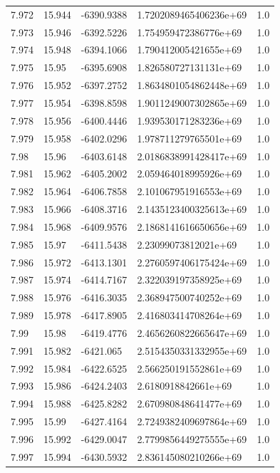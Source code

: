 \begin{tabular}{lllll}
7.972 & 15.944 & -6390.9388 & 1.7202089465406236e+69 & 1.0 \\
7.973 & 15.946 & -6392.5226 & 1.754959472386776e+69 & 1.0 \\
7.974 & 15.948 & -6394.1066 & 1.790412005421655e+69 & 1.0 \\
7.975 & 15.95 & -6395.6908 & 1.826580727131131e+69 & 1.0 \\
7.976 & 15.952 & -6397.2752 & 1.8634801054862448e+69 & 1.0 \\
7.977 & 15.954 & -6398.8598 & 1.9011249007302865e+69 & 1.0 \\
7.978 & 15.956 & -6400.4446 & 1.939530171283236e+69 & 1.0 \\
7.979 & 15.958 & -6402.0296 & 1.978711279765501e+69 & 1.0 \\
7.98 & 15.96 & -6403.6148 & 2.0186838991428417e+69 & 1.0 \\
7.981 & 15.962 & -6405.2002 & 2.059464018995926e+69 & 1.0 \\
7.982 & 15.964 & -6406.7858 & 2.101067951916553e+69 & 1.0 \\
7.983 & 15.966 & -6408.3716 & 2.1435123400325613e+69 & 1.0 \\
7.984 & 15.968 & -6409.9576 & 2.1868141616650656e+69 & 1.0 \\
7.985 & 15.97 & -6411.5438 & 2.23099073812021e+69 & 1.0 \\
7.986 & 15.972 & -6413.1301 & 2.2760597406175424e+69 & 1.0 \\
7.987 & 15.974 & -6414.7167 & 2.322039197358925e+69 & 1.0 \\
7.988 & 15.976 & -6416.3035 & 2.368947500740252e+69 & 1.0 \\
7.989 & 15.978 & -6417.8905 & 2.416803414708264e+69 & 1.0 \\
7.99 & 15.98 & -6419.4776 & 2.4656260822665647e+69 & 1.0 \\
7.991 & 15.982 & -6421.065 & 2.5154350331332955e+69 & 1.0 \\
7.992 & 15.984 & -6422.6525 & 2.566250191552861e+69 & 1.0 \\
7.993 & 15.986 & -6424.2403 & 2.6180918842661e+69 & 1.0 \\
7.994 & 15.988 & -6425.8282 & 2.670980848641477e+69 & 1.0 \\
7.995 & 15.99 & -6427.4164 & 2.7249382409697864e+69 & 1.0 \\
7.996 & 15.992 & -6429.0047 & 2.7799856449275555e+69 & 1.0 \\
7.997 & 15.994 & -6430.5932 & 2.836145080210266e+69 & 1.0 \\

\end{tabular}
